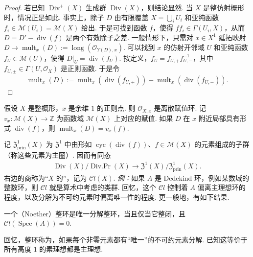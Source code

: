 \begin{proof}
若已知 $\operatorname{Div}^+(X)$ 生成群 $\operatorname{Div}(X)$，则结论显然. 当 $X$ 是整仿射概形时，情况正是如此. 事实上，除子 $D$ 由有限覆盖 $X=\bigcup_iU_i$ 和亚纯函数 $f_i\in\mathcal M(U_i)=\mathcal M(X)$ 给出. 于是可找到函数 $f$，使得 $ff_i\in\Gamma(U_i,X)$，从而 $D=D'-\operatorname{div}(f)$ 是两个有效除子之差.
一般情形下，只需对 $x\in X^1$ 延拓映射 $D\mapsto\operatorname{mult}_x(D):=\operatorname{long}(\mathcal O_{Y(D),x})$. 可以找到 $x$ 的仿射开邻域 $U$ 和亚纯函数 $f_U\in\mathcal M(U)$，使得 $D|_U=\operatorname{div}(f_U)$. 按定义，$f_U=f_{U,+}f_{U,-}^{-1}$，其中 $f_{U,\pm}\in\Gamma(U,\mathcal O_X)$ 是正则函数. 于是令
\begin{align*}
\operatorname{mult}_x(D):=
\operatorname{mult}_x(\operatorname{div}(f_{U,+}))-
\operatorname{mult}_x(\operatorname{div}(f_{U,-})).\tag*{$\square$}
\end{align*}
\renewcommand{\qed}{}%
\end{proof}
\begin{remark}\label{item:ag-1-3-4}
假设 $X$ 是整概形，$x$ 是余维 $1$ 的正则点. 则 $\mathcal O_{X,x}$ 是离散赋值环. 记 $v_x:\mathcal M(X)\longrightarrow\mathbb Z$ 为函数域 $\mathcal M(X)$ 上对应的赋值. 如果 $D$ 在 $x$ 附近局部具有形式 $\operatorname{div}(f)$，则 $\operatorname{mult}_x(D)=v_x(f)$.
\end{remark}
\begin{numpara}\label{item:ag-1-3-5}
记 $\mathfrak Z_{\mathrm{prin}}^1(X)$ 为 $\mathfrak Z^1$ 中由形如 $\operatorname{cyc}(\operatorname{div}(f))$、$f\in\mathcal M(X)$ 的元素组成的子群（称这些元素为主圈）. 因而有同态
\begin{align*}
\operatorname{Div}(X)/\operatorname{Div.Pr}(X)
\longrightarrow\mathfrak Z^1(X)/\mathfrak Z_{\mathrm{prin}}^1(X).
\end{align*}
右边的商称为``$X$ 的''，记为 $\mathcal Cl(X)$.
\emph{例：}如果 $A$ 是 Dedekind 环，例如某数域的整数环，则 $\mathcal Cl$ 就是算术中考虑的类群. 回忆，这个 $\mathcal Cl$ 控制着 $A$ 偏离主理想环的程度，以及分解为不可约元素时偏离唯一性的程度. 更一般地，有如下结果.
\end{numpara}
\begin{proposition}\label{item:ag-1-3-6}
一个（Noether）整环是唯一分解整环，当且仅当它整闭，且 $\mathcal Cl(\operatorname{Spec}(A))=0$.
\end{proposition}
回忆，整环称为，如果每个非零元素都有``唯一''的不可约元素分解. 已知这等价于所有高度 $1$ 的素理想都是主理想.
